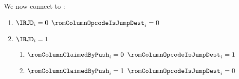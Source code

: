 We now connect \romColumnOpcodeIsJumpDest{} to \IRJD{}:
\begin{enumerate}
    \item \If $\IRJD _{i} = 0$ \Then $\romColumnOpcodeIsJumpDest _{i} = 0$
    \item \If $\IRJD _{i} = 1$ \Then
        \begin{enumerate}
            \item \If $\romColumnClaimedByPush _{i} = 0$ \Then $\romColumnOpcodeIsJumpDest _{i} = 1$
            \item \If $\romColumnClaimedByPush _{i} = 1$ \Then $\romColumnOpcodeIsJumpDest _{i} = 0$
        \end{enumerate}
\end{enumerate}

